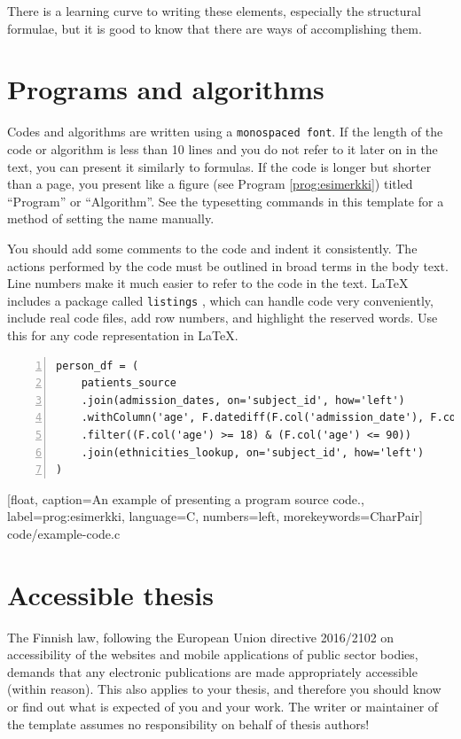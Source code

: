 There is a learning curve to writing these elements, especially the structural formulae, but it is good to know that there are ways of accomplishing them.

\section{Programs and algorithms}

Codes and algorithms are written using a \texttt{monospaced font}. If the length of the code or algorithm is less than 10 lines and you do not refer to it later on in the text, you can present it similarly to formulas. If the code is longer but shorter than a page, you present like a figure (see Program \ref{prog:esimerkki}) titled ``Program'' or ``Algorithm''. See the typesetting commands in this template for a method of setting the name manually.

You should add some comments to the code and indent it consistently. The actions performed by the code must be outlined in broad terms in the body text. Line numbers make it much easier to refer to the code in the text. \LaTeX{} includes a package called \texttt{listings} \parencite{listings,notsoshort}, which can handle code very conveniently, include real code files, add row numbers, and highlight the reserved words. Use this for any code representation in \LaTeX.


\begin{Verbatim}[frame=single, fontsize=\small, numbers=left, label=Example code block]
person_df = (
    patients_source
    .join(admission_dates, on='subject_id', how='left')
    .withColumn('age', F.datediff(F.col('admission_date'), F.col('dob')) / 365.25)
    .filter((F.col('age') >= 18) & (F.col('age') <= 90))
    .join(ethnicities_lookup, on='subject_id', how='left')
)
\end{Verbatim}


    [float,
    caption={An example of presenting a program source code.},
    label=prog:esimerkki,
    language=C,
    numbers=left,
    morekeywords={CharPair}]
    {code/example-code.c}


\section{Accessible thesis}

The Finnish law, following the European Union directive 2016/2102 on accessibility of the websites and mobile applications of public sector bodies, demands that any electronic publications are made appropriately accessible (within reason). This also applies to your thesis, and therefore you should know or find out what is expected of you and your work. The writer or maintainer of the template assumes no responsibility on behalf of thesis authors!

